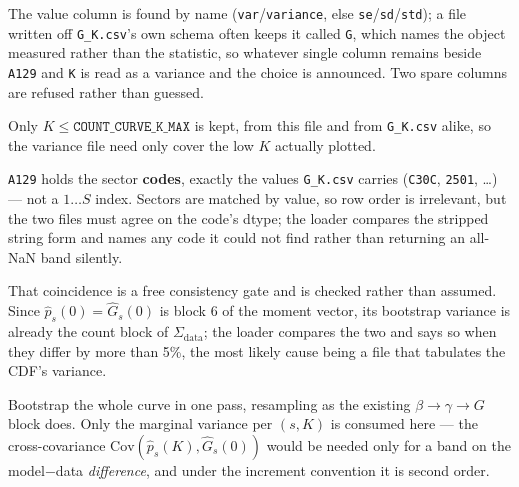 \documentclass[11pt]{article}
\newcommand{\Ghat}{\hat{G}}
\begin{document}
The value column is found by name (\texttt{var}/\texttt{variance}, else
\texttt{se}/\texttt{sd}/\texttt{std}); a file written off \texttt{G\_K.csv}'s own schema
often keeps it called \texttt{G}, which names the object measured rather than the statistic,
so whatever single column remains beside \texttt{A129} and \texttt{K} is read as a variance
and the choice is announced. Two spare columns are refused rather than guessed.

Only $K\le\texttt{COUNT\_CURVE\_K\_MAX}$ is kept, from this file and from
\texttt{G\_K.csv} alike, so the variance file need only cover the low $K$ actually plotted.

\texttt{A129} holds the sector \textbf{codes}, exactly the values \texttt{G\_K.csv} carries
(\texttt{C30C}, \texttt{2501}, \dots) --- not a $1\dots S$ index. Sectors are matched by
value, so row order is irrelevant, but the two files must agree on the code's dtype; the
loader compares the stripped string form and names any code it could not find rather than
returning an all-NaN band silently.

That coincidence is a free consistency gate and is checked rather than assumed. Since
$\hat p_s(0)=\Ghat_s(0)$ is block 6 of the moment vector, its bootstrap variance is already
the count block of $\Sigma_{\mathrm{data}}$; the loader compares the two and says so when they
differ by more than 5\%, the most likely cause being a file that tabulates the CDF's variance.

Bootstrap the whole curve in one pass, resampling as the existing $\beta\to\gamma\to G$ block
does. Only the marginal variance per $(s,K)$ is consumed here --- the cross-covariance
$\mathrm{Cov}(\hat p_s(K),\Ghat_s(0))$ would be needed only for a band on the model$-$data
\emph{difference}, and under the increment convention it is second order.
\end{document}
